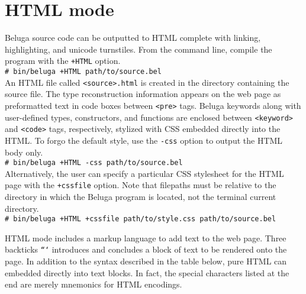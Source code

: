 \documentclass[11pt]{article}
\newcommand{\shellcmd}[1]{\\\indent\texttt{\# #1}\\}
\begin{document}

\section{HTML mode}
Beluga source code can be outputted to HTML complete with linking, highlighting, and unicode turnstiles. From the command line, compile the program with the \texttt{+HTML} option.
\shellcmd{bin/beluga +HTML path/to/source.bel}
An HTML file called \texttt{<source>.html} is created in the directory containing the source file. The type reconstruction information appears on the web page as preformatted text in code boxes between \texttt{<pre>} tags. Beluga keywords along with user-defined types, constructors, and functions are enclosed between \texttt{<keyword>} and \texttt{<code>} tags, respectively, stylized with CSS embedded directly into the HTML. To forgo the default style, use the \texttt{-css} option to output the HTML body only.
\shellcmd{bin/beluga +HTML -css path/to/source.bel}
Alternatively, the user can specify a particular CSS stylesheet for the HTML page with the \texttt{+cssfile} option. Note that filepaths must be relative to the directory in which the Beluga program is located, not the terminal current directory.
\shellcmd{bin/beluga +HTML +cssfile path/to/style.css path/to/source.bel}

\newpage

HTML mode includes a markup language to add text to the web page. Three backticks \texttt{```} introduces and concludes a block of text to be rendered onto the page. In addition to the syntax described in the table below, pure HTML can embedded directly into text blocks. In fact, the special characters listed at the end are merely mnemonics for HTML encodings. \\
\end{document}
